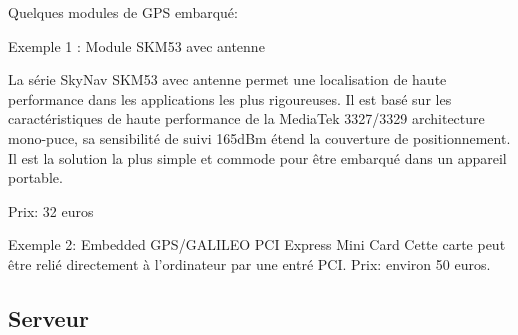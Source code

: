 Quelques modules de GPS embarqué:
\begin{description}
\item Exemple 1 : Module SKM53 avec antenne

\begin{figure}
\begin{center}


\end{center}
\end{figure}

La série SkyNav SKM53 avec antenne permet une localisation de haute performance dans les applications les plus rigoureuses.
Il est basé sur les caractéristiques de haute performance de la MediaTek 3327/3329 architecture mono-puce, sa sensibilité de suivi 165dBm étend la couverture de positionnement. Il est la solution la plus simple et commode pour être embarqué dans un appareil portable.

Prix: 32 euros

\item Exemple 2: Embedded GPS/GALILEO PCI Express Mini Card
Cette carte peut être relié directement à l'ordinateur par une entré PCI.
Prix: environ 50 euros.
\end{description}
\subsection{Serveur}
\vfill
\pagebreak
